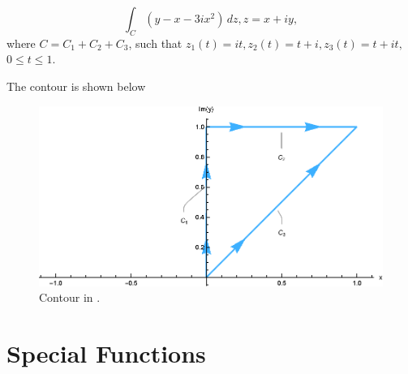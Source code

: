 \documentclass[12pt]{book}
\begin{document}
\begin{exmp}
    \[
        \int_{C} (y - x - 3ix^2)\,dz, z = x + iy,
    \]
where $C = C_1 + C_2 + C_3$, such that $z_{1}(t) = it, z_{2}(t) = t + i, z_{3}(t) = t + it,$ $0 \leq t \leq 1.$
\end{exmp}
The contour is shown below
\begin{figure}[H]
    \centering
    \includegraphics[scale = 0.7]{./figs/chapter_2/ci_contour_ex_1.eps}
    \caption{Contour in .}
\end{figure}


\section{Special Functions}
\end{document}
